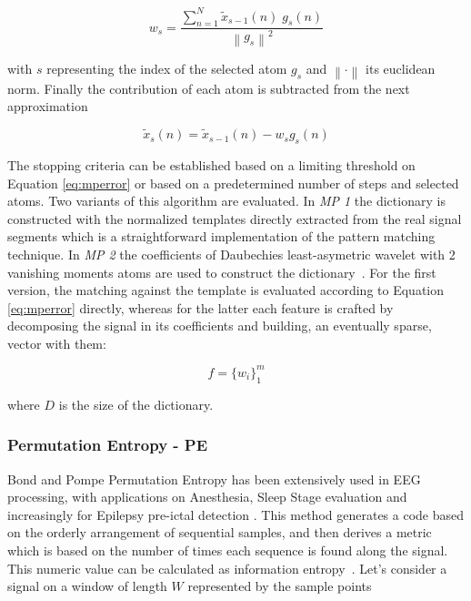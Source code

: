 \begin{equation}
w_{s} =  \frac{\sum_{n=1}^{N} \tilde{x}_{s-1}(n) \; g_{s}(n)}{  {\left\lVert  g_{s} \right\rVert}^{2} }
\label{eq:mp4}
\end{equation}

\noindent with $s$ representing the index of the selected atom $g_{s}$ and $\left\lVert \cdot \right\rVert$ its euclidean norm.  Finally the contribution of each atom is subtracted from the next approximation~\cite{Cohen2014,Sanei2007, Mallat1993}

\begin{equation}
\tilde{x}_{s}(n)=  \tilde{x}_{s-1}(n) - w_{s} g_{s} (n)
\label{eq:mp5}
\end{equation}

The stopping criteria can be established based on a limiting threshold on Equation \ref{eq:mperror} or based on a predetermined number of steps and selected atoms.  Two variants of this algorithm are evaluated. In \textit{MP 1} the dictionary is constructed with the normalized templates directly extracted from the real signal segments which is a straightforward implementation of the pattern matching technique.  In \textit{MP 2} the coefficients of Daubechies least-asymetric wavelet with 2 vanishing moments atoms are used to construct the dictionary~\cite{Vareka2012}.  For the first version, the matching against the template is evaluated according to Equation \ref{eq:mperror} directly, whereas for the latter each feature is crafted by decomposing the signal in its coefficients and building, an eventually sparse, vector with them:

\begin{equation}
f =  {\bigg \{ w_{i} \bigg \}}_{1}^{m} 
\label{eq:mp6}
\end{equation}

\noindent where $D$ is the size of the dictionary.  



\subsubsection{Permutation Entropy - PE}

Bond and Pompe Permutation Entropy has been extensively used in EEG processing, with applications on Anesthesia, Sleep Stage evaluation and increasingly for Epilepsy pre-ictal detection \cite{Bandt2002}.  This method generates a code based on the orderly arrangement of sequential samples, and then derives a metric which is based on the number of times each sequence is found along the signal.  This numeric value can be calculated as information entropy~\cite{Nicolaou2010}. Let's consider a signal on a window of length $W$ represented by the sample points

